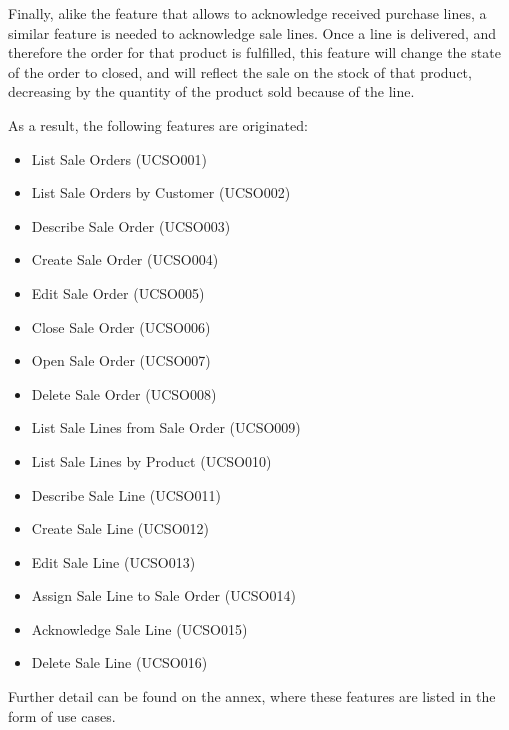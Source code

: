 Finally, alike the feature that allows to acknowledge received purchase lines, a similar feature is needed to acknowledge sale lines. Once a line is delivered, and therefore the order for that product is fulfilled, this feature will change the state of the order to closed, and will reflect the sale on the stock of that product, decreasing by the quantity of the product sold because of the line.

As a result, the following features are originated:

\begin{itemize}
\item List Sale Orders (UCSO001)
\item List Sale Orders by Customer (UCSO002)
\item Describe Sale Order (UCSO003)
\item Create Sale Order (UCSO004)
\item Edit Sale Order (UCSO005)
\item Close Sale Order (UCSO006)
\item Open Sale Order (UCSO007)
\item Delete Sale Order (UCSO008)
\item List Sale Lines from Sale Order (UCSO009)
\item List Sale Lines by Product (UCSO010)
\item Describe Sale Line (UCSO011)
\item Create Sale Line (UCSO012)
\item Edit Sale Line (UCSO013)
\item Assign Sale Line to Sale Order (UCSO014)
\item Acknowledge Sale Line (UCSO015)
\item Delete Sale Line (UCSO016)
\end{itemize}

Further detail can be found on the annex, where these features are listed in the form of use cases.